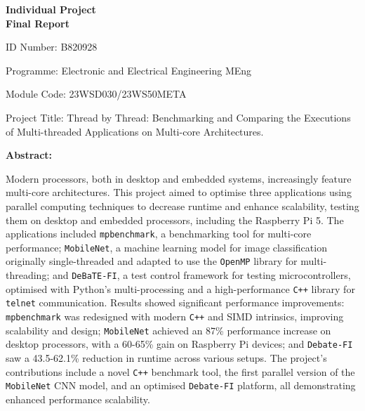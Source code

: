 \documentclass[12pt, openany]{book}
\begin{document}
\begin{titlepage}
	\centering
	\vspace*{1cm} %
	{\Huge\bfseries Individual Project\\[0.5cm] Final Report\par}
	\vspace{2cm}
	\raggedright
	ID Number: B820928\par
	
	Programme: Electronic and Electrical Engineering MEng\par
	
	Module Code: 23WSD030/23WS50META\par
	
	Project Title: Thread by Thread: Benchmarking and Comparing the Executions of Multi-threaded Applications on Multi-core Architectures.\par
	
	\textbf{Abstract:}\par %

	Modern processors, both in desktop and embedded systems, increasingly feature multi-core architectures. This project aimed to optimise three applications using parallel computing techniques to decrease runtime and enhance scalability, testing them on desktop and embedded processors, including the Raspberry Pi 5. The applications included \texttt{mpbenchmark}, a benchmarking tool for multi-core performance; \texttt{MobileNet}, a machine learning model for image classification originally single-threaded and adapted to use the \texttt{OpenMP} library for multi-threading; and \texttt{DeBaTE-FI}, a test control framework for testing microcontrollers, optimised with Python’s multi-processing and a high-performance \texttt{C++} library for \texttt{telnet} communication. Results showed significant performance improvements: \texttt{mpbenchmark} was redesigned with modern \texttt{C++} and SIMD intrinsics, improving scalability and design; \texttt{MobileNet} achieved an 87\% performance increase on desktop processors, with a 60-65\% gain on Raspberry Pi devices; and \texttt{Debate-FI} saw a 43.5-62.1\% reduction in runtime across various setups. The project's contributions include a novel \texttt{C++} benchmark tool, the first parallel version of the \texttt{MobileNet} CNN model, and an optimised \texttt{Debate-FI} platform, all demonstrating enhanced performance scalability.

\end{titlepage}
\end{document}
